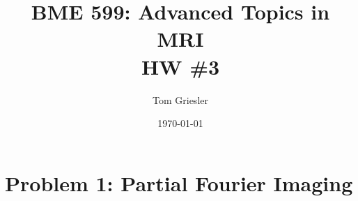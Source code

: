 \documentclass{article}
\title{BME 599: Advanced Topics in MRI\\HW \#3}
\author{Tom Griesler}
\date{\today}
\begin{document}
\maketitle

\section{Problem 1: Partial Fourier Imaging}
\end{document}
